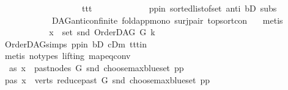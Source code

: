 \begin{isabellebody}
\ \ \ \ \ \ \ \ \ \ \ \ \ \ \ \ \ \ \ ttt{\isacharparenright}{\kern0pt}{\isacharparenright}{\kern0pt}{\isachardoublequoteclose}\ \isanewline
\ \ \ \ \ \ \ \ \ \ \isamarkupfalse%
\ pp{\isacharunderscore}{\kern0pt}in\ sorted{\isacharunderscore}{\kern0pt}list{\isacharunderscore}{\kern0pt}of{\isacharunderscore}{\kern0pt}set{\isacharparenleft}{\kern0pt}{}{\isacharparenright}{\kern0pt}\ anti\ bD\ subs{\isacharparenleft}{\kern0pt}{}{\isacharparenright}{\kern0pt}\isanewline
\ \ \ \ \ \ \ \ \ \ \ \ DAG{\isachardot}{\kern0pt}anticon{\isacharunderscore}{\kern0pt}finite\ fold{\isacharunderscore}{\kern0pt}app{\isacharunderscore}{\kern0pt}mono{}\ surj{\isacharunderscore}{\kern0pt}pair\ top{\isacharunderscore}{\kern0pt}sort{\isacharunderscore}{\kern0pt}con\ \ \isamarkupfalse%
\ metis\ \isanewline
\ \ \ \ \ \ \ \ \isamarkupfalse%
\ \isamarkupfalse%
\ {\isachardoublequoteopen}x\ {\isasymin}\ set\ {\isacharparenleft}{\kern0pt}snd\ {\isacharparenleft}{\kern0pt}OrderDAG\ G\ k{\isacharparenright}{\kern0pt}{\isacharparenright}{\kern0pt}{\isachardoublequoteclose}\ \isamarkupfalse%
\ OrderDAG{\isachardot}{\kern0pt}simps\ pp{\isacharunderscore}{\kern0pt}in\ bD\ cDm\ ttt{\isacharunderscore}{\kern0pt}in\ {}\isanewline
\ \ \ \ \ \ \ \ \ \ \isamarkupfalse%
\ {\isacharparenleft}{\kern0pt}metis\ {\isacharparenleft}{\kern0pt}no{\isacharunderscore}{\kern0pt}types{\isacharcomma}{\kern0pt}\ lifting{\isacharparenright}{\kern0pt}\ map{\isacharunderscore}{\kern0pt}eq{\isacharunderscore}{\kern0pt}conv{\isacharparenright}{\kern0pt}\ \isanewline
\ \ \ \ \ \ \isamarkupfalse%
\ \isanewline
\ \ \ \ \ \ \ \ \isamarkupfalse%
\ \ as{}{\isacharcolon}{\kern0pt}\ {\isachardoublequoteopen}x\ {\isasymin}\ past{\isacharunderscore}{\kern0pt}nodes\ G\ {\isacharparenleft}{\kern0pt}snd\ {\isacharparenleft}{\kern0pt}choose{\isacharunderscore}{\kern0pt}max{\isacharunderscore}{\kern0pt}blue{\isacharunderscore}{\kern0pt}set\ pp{\isacharparenright}{\kern0pt}{\isacharparenright}{\kern0pt}{\isachardoublequoteclose}\isanewline
\ \ \ \ \ \ \ \ \isamarkupfalse%
\ \isamarkupfalse%
\ pas{\isacharcolon}{\kern0pt}\ {\isachardoublequoteopen}x\ {\isasymin}\ verts\ {\isacharparenleft}{\kern0pt}reduce{\isacharunderscore}{\kern0pt}past\ G\ {\isacharparenleft}{\kern0pt}snd\ {\isacharparenleft}{\kern0pt}choose{\isacharunderscore}{\kern0pt}max{\isacharunderscore}{\kern0pt}blue{\isacharunderscore}{\kern0pt}set\ pp{\isacharparenright}{\kern0pt}{\isacharparenright}{\kern0pt}{\isacharparenright}{\kern0pt}{\isachardoublequoteclose}\ \isanewline

\end{isabellebody}
